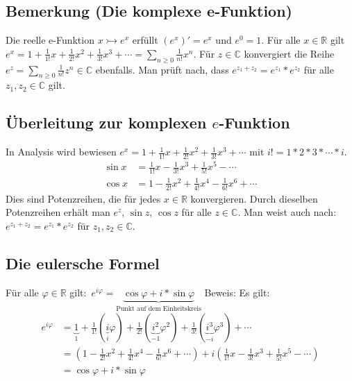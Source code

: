 \subsection{Bemerkung (Die komplexe e-Funktion)}
Die reelle e-Funktion $x \rightarrowtail e^x$ erfüllt $(e^x)' = e^x$ und $e^0=1$.
Für alle $x \in \mathbb{R}$ gilt $e^x = 1+\frac{1}{1!}x+\frac{1}{2!}x^2+\frac{1}{3!}x^3+\cdots = \sum_{n \geq 0} \frac{1}{n!}x^n$.
Für $z \in \mathbb{C}$ konvergiert die Reihe $e^z = \sum_{n \geq 0} \frac{1}{n!}z^n \in \mathbb{C}$ ebenfalls.
Man prüft nach, dass $e^{z_1+z_2} = e^{z_1} * e^{z_2}$ für alle $z_1, z_2 \in \mathbb{C}$ gilt.


\subsection*{Überleitung zur komplexen $e$-Funktion}
In Analysis wird bewiesen $e^x = 1 + \frac{1}{1!}x + \frac{1}{2!}x^2 + \frac{1}{3!}x^3 + \cdots$ mit $i!= 1*2*3*\cdots*i$.
\begin{align}
\sin{x} &= \frac{1}{1!}x - \frac{1}{3!}x^3 + \frac{1}{5!}x^5 - \cdots \\
\cos{x} &= 1 - \frac{1}{2!}x^2 + \frac{1}{4!}x^4 - \frac{1}{6!}x^6 + \cdots 
\end{align}
Dies sind Potenzreihen, die für jedes $x\in\mathbb{R}$ konvergieren.
Durch dieselben Potenzreihen erhält man $e^z,\,\sin{z},\,\cos{z}$ für alle $z\in\mathbb{C}$.
Man weist auch nach: $e^{z_1+z_2} = e^{z_1} * e^{z_2}$ für $z_1, z_2 \in \mathbb{C}$.

\subsection{Die eulersche Formel}
Für alle $\varphi \in \mathbb{R}$ gilt: $e^{i\varphi} = \underbrace{\cos{\varphi}+i*\sin{\varphi}}_{\text{Punkt auf dem Einheitskreis}}$
Beweis: Es gilt:
\begin{align}
e^{i\varphi}
&= \underbrace{1}_1 + \frac{1}{1!}(\underbrace{i}_i\varphi) + \frac{1}{2!}(\underbrace{i^2}_{-1}\varphi^2) + \frac{1}{3!}(\underbrace{i^3}_{-i}\varphi^3) + \cdots \\
&= (1 - \frac{1}{2!}x^2 + \frac{1}{4!}x^4 - \frac{1}{6!}x^6 + \cdots) + i (\frac{1}{1!}x - \frac{1}{3!}x^3 + \frac{1}{5!}x^5 - \cdots) \\
&= \cos{\varphi}+i*\sin{\varphi} \\
\end{align}

